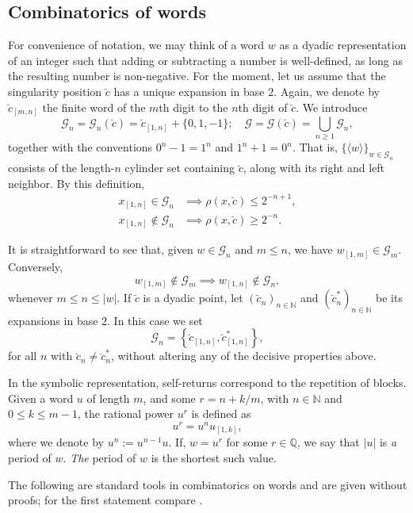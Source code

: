 \documentclass[11pt,reqno]{amsart}
\theoremstyle{plain}
\theoremstyle{definition}
\newcommand{\Q}{{\mathbb Q}}
\newcommand{\N}{{\mathbb N}}
\newcommand{\mc}{\mathcal}
\begin{document}
\subsection{Combinatorics of words}

For convenience of notation, we may think of a word $w$ as a dyadic representation of an integer such that adding or subtracting a number is well-defined, as long as the resulting number is non-negative. For the moment, let us assume that the singularity position $\breve{c}$ has a unique expansion in base $2$.
Again, we denote by $\breve{c}_{[m,n]}$ the finite word of the $m$th digit to the $n$th digit of $\breve{c}$.
We introduce
\[
\mc G_n = \mc G_n(\breve{c}) = \breve{c}_{[1,n]} + \{ 0,1,-1 \}; \quad \mc G =\mc G (\breve{c})= \bigcup_{n \geqslant 1} \mc G_n,
\]
together with the conventions $0^n - 1 = 1^n$ and $1^n + 1 = 0^n$.
That is, $\{\langle w \rangle\}_{w \in \mc G_n}$ consists of the length-$n$ cylinder set containing $\breve{c}$, along with its right and left neighbor. By this definition, 
\begin{align*}
x_{[1,n]} \in \mc G_n & \implies \rho(x,\breve{c}) \leqslant 2^{-n+1},
\\x_{[1,n]} \notin \mc G_n & \implies \rho(x,\breve{c}) \geqslant 2^{-n}.
\end{align*}


It is straightforward to see that, given $w \in \mc G_n$ and $m \leqslant n$, we have $w_{[1,m]} \in \mc G_m$. Conversely,
\[
w_{[1,m]} \notin \mc G_m \implies w_{[1,n]} \notin \mc G_n,
\]
whenever $m \leqslant n \leqslant |w|$.
If $\breve{c}$ is a dyadic point, let $(\breve{c}_n)_{n\in\N}$ and $(\breve{c}^\ast_n)_{n \in \N}$ be its expansions in base $2$. In this case we set 
\[
\mc G_n = \left\{\breve{c}_{[1,n]}, \breve{c}^\ast_{[1,n]} \right\},
\]
for all $n$ with $\breve{c}_n \neq \breve{c}^\ast_n$,
without altering any of the decisive properties above.

In the symbolic representation, self-returns correspond to the repetition of blocks. Given a word $u$ of length $m$,
and some $r = n + k/m$, with $n \in \N$ and $0\leqslant k \leqslant m-1$, the rational power $u^r$ is defined as
\[
u^r = u^n u_{[1,k]},
\]
where we denote by $u^n:=u^{n-1}u$.
If, $w = u^r$ for some $r \in \Q$, we say that $|u|$ is \emph{a} period of $w$. \emph{The} period of $w$ is the shortest such value.



The following are standard tools in combinatorics on words and are given without proofs; for the first statement compare \cite[Lem.~1]{ABCD}.
\end{document}
